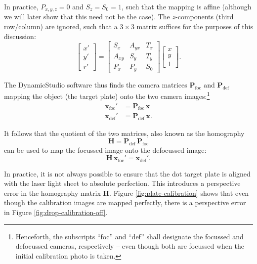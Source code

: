 \documentclass[11.5pt]{book}
\begin{document}
In practice, $P_{x,y,z} = 0$ and $S_z = S_0 = 1$, such that the mapping is
affine (although we will later show that this need not be the case). The
$z$-components (third row/column) are ignored, such that a $3 \times 3$ matrix
suffices for the purposes of this discussion:
\begin{equation}
\left[\begin{array}{c} x'\\ y'\\ r' \end{array} \right]
=
\left[ \begin{array}{ccc}
S_x & A_{yx} &  T_x \\
A_{xy} & S_y &  T_y \\
P_x & P_y & S_0
\end{array} \right]
\left[ \begin{array}{c} x\\ y \\ 1 \end{array} \right].
\end{equation}

The DynamicStudio software thus finds the camera matrices
$\mathbf{P}_\text{foc}$ and $\mathbf{P}_\text{def}$ mapping the
object (the target plate) onto the two camera images:\footnote{Henceforth, the
    subscripts ``foc'' and ``def'' shall designate the focussed and defocussed
    cameras, respectively -- even though both are focussed when the initial
calibration photo is taken.}
\begin{align}
    \mathbf{x}_\text{foc}' &= \mathbf{P}_\text{foc} \, \mathbf{x} \\
    \mathbf{x}_\text{def}' &= \mathbf{P}_\text{def} \, \mathbf{x}.
\end{align}

It follows that the quotient of the two matrices, also known as the homography
\begin{equation}
    \mathbf{H} = \mathbf{P}_\text{def} \, \mathbf{P}_\text{foc}
\end{equation}
can be used to map the focussed image onto the defocussed image:
\begin{equation}
    \mathbf{H}\, \mathbf{x}_\text{foc}' = \mathbf{x}_\text{def}'.
    \label{homography-definition}
\end{equation}

In practice, it is not always possible to ensure that the dot target plate is
aligned with the laser light sheet to absolute perfection. This introduces a
perspective error in the homography matrix $\mathbf{H}$. Figure
\ref{fig:plate-calibration} shows that even though the calibration images
are mapped perfectly, there is a perspective error in Figure
\ref{fig:drop-calibration-off}.
\end{document}
